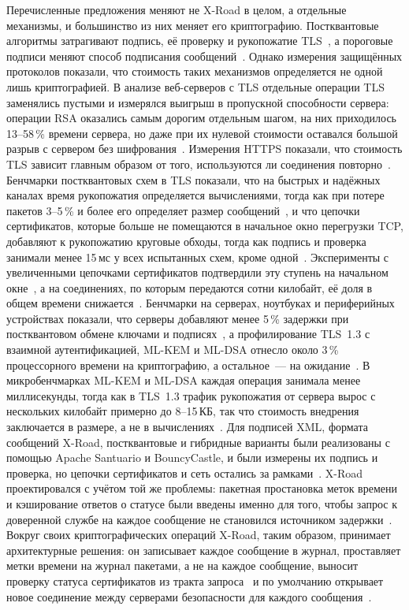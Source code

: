 \documentclass[conference,a4paper]{IEEEtran}
\newcommand{\newtext}[1]{{\color{blue}#1}}
\begin{document}
{\color{blue}
Перечисленные предложения меняют не X-Road в целом, а отдельные механизмы, и большинство из них
меняет его криптографию. Постквантовые алгоритмы затрагивают подпись, её проверку и рукопожатие
TLS~\cite{bakhtina2026pqc}, а пороговые подписи меняют способ подписания
сообщений~\cite{bakhtina2026ijis}. Однако измерения защищённых протоколов показали, что стоимость
таких механизмов определяется не одной лишь криптографией. В анализе веб-серверов с TLS отдельные
операции TLS заменялись пустыми и измерялся выигрыш в пропускной способности сервера: операции RSA
оказались самым дорогим отдельным шагом, на них приходилось 13--58\,\% времени сервера, но даже при
их нулевой стоимости оставался большой разрыв с сервером без шифрования~\cite{coarfa2006}. Измерения
HTTPS показали, что стоимость TLS зависит главным образом от того, используются ли соединения
повторно~\cite{naylor2014}. Бенчмарки постквантовых схем в TLS показали, что на быстрых и надёжных
каналах время рукопожатия определяется вычислениями, тогда как при потере пакетов 3--5\,\% и более его
определяет размер сообщений~\cite{paquin2020}, и что цепочки сертификатов, которые больше не
помещаются в начальное окно перегрузки TCP, добавляют к рукопожатию круговые обходы, тогда как подпись
и проверка занимали менее 15\,мс у всех испытанных схем, кроме одной~\cite{sikeridis2020}.
\newtext{Эксперименты с увеличенными цепочками сертификатов подтвердили эту ступень на начальном
окне~\cite{westerbaan2021,chou2026}, а на соединениях, по которым передаются сотни килобайт, её доля в
общем времени снижается~\cite{kampanakis2024}.
\newtext{Бенчмарки на серверах, ноутбуках и периферийных устройствах показали, что серверы добавляют
менее 5\,\% задержки при постквантовом обмене ключами и подписях~\cite{abbasi2025}, а профилирование
TLS~1.3 с взаимной аутентификацией, ML-KEM и ML-DSA отнесло около 3\,\% процессорного времени на
криптографию, а остальное~--- на ожидание~\cite{rahul2026}. В микробенчмарках ML-KEM и ML-DSA
каждая операция занимала менее миллисекунды, тогда как в TLS~1.3 трафик рукопожатия от сервера вырос
с нескольких килобайт примерно до 8--15\,КБ, так что стоимость внедрения заключается в размере, а не в
вычислениях~\cite{demir2026}.}
Для подписей XML, формата сообщений X-Road, постквантовые и гибридные варианты были
реализованы с помощью Apache Santuario и BouncyCastle, и были измерены их подпись и проверка,
но цепочки сертификатов и сеть остались за рамками~\cite{mueller2024}.} X-Road проектировался с учётом
той же проблемы: пакетная простановка меток времени и кэширование ответов о статусе были введены
именно для того, чтобы запрос к доверенной службе на каждое сообщение не становился источником
задержки~\cite{ansper2013}. Вокруг своих криптографических операций X-Road, таким образом, принимает
архитектурные решения: он записывает каждое сообщение в журнал, проставляет метки времени на журнал
пакетами, а не на каждое сообщение, выносит проверку статуса сертификатов из тракта
запроса~\cite{ansper2013} и по умолчанию открывает новое соединение между серверами безопасности
для каждого сообщения~\cite{xroadsyspar}.

}
\end{document}
